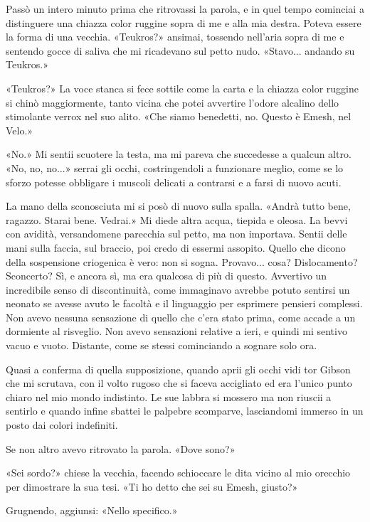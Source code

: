 Passò un intero minuto prima che ritrovassi la parola, e in quel tempo
cominciai a distinguere una chiazza color ruggine sopra di me e alla mia
destra. Poteva essere la forma di una vecchia. «Teukros?» ansimai,
tossendo nell'aria sopra di me e sentendo gocce di saliva che mi
ricadevano sul petto nudo. «Stavo... andando su Teukros.»

«Teukros?» La voce stanca si fece sottile come la carta e la chiazza
color ruggine si chinò maggiormente, tanto vicina che potei avvertire
l'odore alcalino dello stimolante verrox nel suo alito. «Che siamo
benedetti, no. Questo è Emesh, nel Velo.»

«No.» Mi sentii scuotere la testa, ma mi pareva che succedesse a qualcun
altro. «No, no, no...» serrai gli occhi, costringendoli a funzionare
meglio, come se lo sforzo potesse obbligare i muscoli delicati a
contrarsi e a farsi di nuovo acuti.

La mano della sconosciuta mi si posò di nuovo sulla spalla. «Andrà tutto
bene, ragazzo. Starai bene. Vedrai.» Mi diede altra acqua, tiepida e
oleosa. La bevvi con avidità, versandomene parecchia sul petto, ma non
importava. Sentii delle mani sulla faccia, sul braccio, poi credo di
essermi assopito. Quello che dicono della sospensione criogenica è vero:
non si sogna. Provavo... cosa? Dislocamento? Sconcerto? Sì, e ancora sì,
ma era qualcosa di più di questo. Avvertivo un incredibile senso di
discontinuità, come immaginavo avrebbe potuto sentirsi un neonato se
avesse avuto le facoltà e il linguaggio per esprimere pensieri
complessi. Non avevo nessuna sensazione di quello che c'era stato prima,
come accade a un dormiente al risveglio. Non avevo sensazioni relative a
ieri, e quindi mi sentivo vacuo e vuoto. Distante, come se stessi
cominciando a sognare solo ora.

Quasi a conferma di quella supposizione, quando aprii gli occhi vidi tor
Gibson che mi scrutava, con il volto rugoso che si faceva accigliato ed
era l'unico punto chiaro nel mio mondo indistinto. Le sue labbra si
mossero ma non riuscii a sentirlo e quando infine sbattei le palpebre
scomparve, lasciandomi immerso in un posto dai colori indefiniti.

Se non altro avevo ritrovato la parola. «Dove sono?»

«Sei sordo?» chiese la vecchia, facendo schioccare le dita vicino al mio
orecchio per dimostrare la sua tesi. «Ti ho detto che sei su Emesh,
giusto?»

Grugnendo, aggiunsi: «Nello specifico.»

